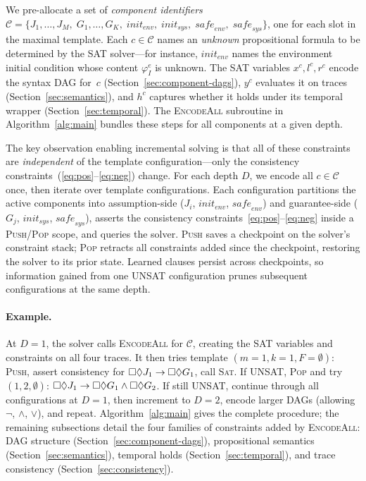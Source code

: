 We pre-allocate a set of \emph{component identifiers}
$\mathcal{C} = \{J_1,\ldots,J_M,\; G_1,\ldots,G_K,\;
\mathit{init}_\mathit{env},\; \mathit{init}_\mathit{sys},\;
\mathit{safe}_\mathit{env},\; \mathit{safe}_\mathit{sys}\}$,
one for each slot in the maximal template.
Each $c \in \mathcal{C}$ names an \emph{unknown} propositional
formula to be determined by the SAT solver---for instance,
$\mathit{init}_\mathit{env}$ names the environment initial condition
whose content $\varphi_I^e$ is unknown.
The SAT variables $x^c, l^c, r^c$ encode the syntax DAG for~$c$
(Section~\ref{sec:component-dags}),
$y^c$ evaluates it on traces
(Section~\ref{sec:semantics}),
and $h^c$ captures whether it holds under its temporal wrapper
(Section~\ref{sec:temporal}).
The \textsc{EncodeAll} subroutine in
Algorithm~\ref{alg:main} bundles these steps for all
components at a given depth.

The key observation enabling incremental solving is that all
of these constraints are \emph{independent} of the template
configuration---only the consistency
constraints~(\eqref{eq:pos}--\eqref{eq:neg}) change.
For each depth $D$, we encode all $c \in \mathcal{C}$ once,
then iterate over template configurations.
Each configuration partitions the active components into
assumption-side ($J_i$, $\mathit{init}_\mathit{env}$, $\mathit{safe}_\mathit{env}$) and
guarantee-side ($G_j$, $\mathit{init}_\mathit{sys}$, $\mathit{safe}_\mathit{sys}$),
asserts the consistency constraints~\eqref{eq:pos}--\eqref{eq:neg}
inside a \textsc{Push}/\textsc{Pop} scope, and queries the solver.
\textsc{Push} saves a checkpoint on the solver's
constraint stack; \textsc{Pop} retracts all constraints added since
the checkpoint, restoring the solver to its prior state.
Learned clauses persist across checkpoints, so information
gained from one UNSAT configuration prunes subsequent
configurations at the same depth.

\paragraph{Example.}
At $D = 1$, the solver calls
\textsc{EncodeAll} for $\mathcal{C}$,
creating the SAT variables and constraints on all four traces.
It then tries template $(m{=}1, k{=}1, F{=}\emptyset)$:
\textsc{Push}, assert consistency for $\square\Diamond J_1 \to
\square\Diamond G_1$, call \textsc{Sat}.
If UNSAT, \textsc{Pop} and try $(1, 2, \emptyset)$:
$\square\Diamond J_1 \to \square\Diamond G_1 \land
\square\Diamond G_2$.
If still UNSAT, continue through all configurations at $D = 1$,
then increment to $D = 2$, encode larger DAGs (allowing
$\lnot$, $\land$, $\lor$), and repeat.
Algorithm~\ref{alg:main} gives the complete procedure;
the remaining subsections detail the four families of constraints
added by \textsc{EncodeAll}: DAG structure
(Section~\ref{sec:component-dags}), propositional semantics
(Section~\ref{sec:semantics}), temporal holds
(Section~\ref{sec:temporal}), and trace consistency
(Section~\ref{sec:consistency}).

